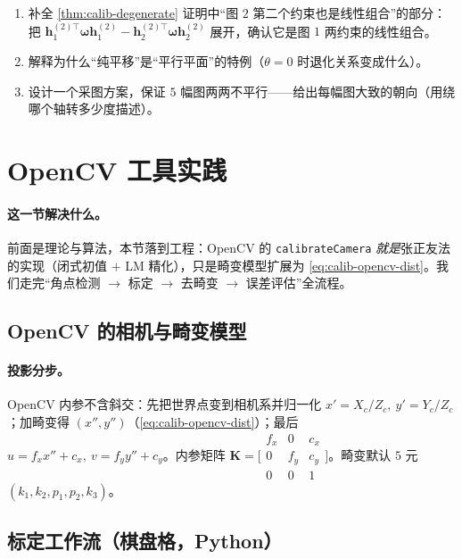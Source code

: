 \begin{practice}[练习]
\begin{enumerate}
  \item 补全 \cref{thm:calib-degenerate} 证明中“图 $2$ 第二个约束也是线性组合”的部分：把 $\mathbf{h}_1^{(2)\top}\boldsymbol{\omega}\mathbf{h}_1^{(2)}-\mathbf{h}_2^{(2)\top}\boldsymbol{\omega}\mathbf{h}_2^{(2)}$ 展开，确认它是图 $1$ 两约束的线性组合。
  \item 解释为什么“纯平移”是“平行平面”的特例（$\theta=0$ 时退化关系变成什么）。
  \item 设计一个采图方案，保证 $5$ 幅图两两不平行——给出每幅图大致的朝向（用绕哪个轴转多少度描述）。
\end{enumerate}
\end{practice}

\section{OpenCV 工具实践}
\label{sec:calib-opencv}

\paragraph{这一节解决什么。}
前面是理论与算法，本节落到工程：OpenCV 的 \texttt{calibrateCamera} \emph{就是}张正友法的实现（闭式初值 $+$ LM 精化），只是畸变模型扩展为 \cref{eq:calib-opencv-dist}。我们走完“角点检测 $\to$ 标定 $\to$ 去畸变 $\to$ 误差评估”全流程。

\subsection{OpenCV 的相机与畸变模型}

\paragraph{投影分步。}
OpenCV 内参不含斜交\cite{opencv2024calib}：先把世界点变到相机系并归一化 $x'=X_c/Z_c,\ y'=Y_c/Z_c$；加畸变得 $(x'',y'')$（\cref{eq:calib-opencv-dist}）；最后 $u=f_xx''+c_x,\ v=f_yy''+c_y$。内参矩阵 $\mathbf{K}=\big[\begin{smallmatrix}f_x&0&c_x\\0&f_y&c_y\\0&0&1\end{smallmatrix}\big]$。畸变默认 $5$ 元 $(k_1,k_2,p_1,p_2,k_3)$。

\subsection{标定工作流（棋盘格，Python）}
\label{sec:calib-opencv-workflow}


